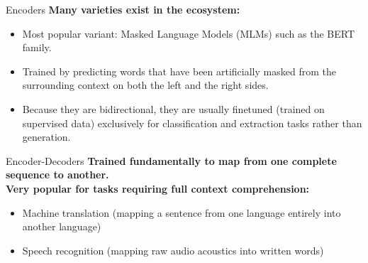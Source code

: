 \documentclass[aspectratio=169]{beamer}
\begin{document}
\begin{frame}{Encoders}\justifying
    \textbf{Many varieties exist in the ecosystem:}
    \begin{itemize}
        \item Most popular variant: Masked Language Models (MLMs) such as the BERT family.
        \item Trained by predicting words that have been artificially masked from the surrounding context on both the left and the right sides.
        \item Because they are bidirectional, they are usually finetuned (trained on supervised data) exclusively for classification and extraction tasks rather than generation.
    \end{itemize}
    \vspace{0.3cm}
    \begin{figure}[htbp]
      \centering
    \end{figure}
\end{frame}

\begin{frame}{Encoder-Decoders}\justifying
    \textbf{Trained fundamentally to map from one complete sequence to another.} \\
    \vspace{0.5cm}
    \textbf{Very popular for tasks requiring full context comprehension:}
    \begin{itemize}
        \item Machine translation (mapping a sentence from one language entirely into another language)
        \item Speech recognition (mapping raw audio acoustics into written words)
    \end{itemize}
    \vspace{0.3cm}
    \begin{figure}[htbp]
      \centering
    \end{figure}
    \vspace{2.5cm}
\end{frame}
\end{document}
